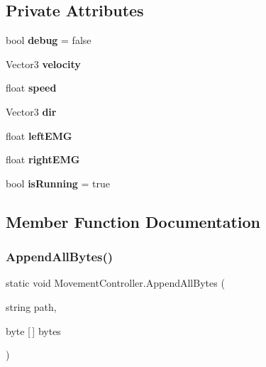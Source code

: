 \subsection*{Private Attributes}
\begin{DoxyCompactItemize}
\item 
\mbox{\label{class_movement_controller_a00c528555c7f5959b3942ded1eb43b33}} 
bool {\bfseries debug} = false
\item 
\mbox{\label{class_movement_controller_aff5f35e406fcb7cff3402f7ff666be3d}} 
Vector3 {\bfseries velocity}
\item 
\mbox{\label{class_movement_controller_afef3c088f09142fe007219818445d82a}} 
float {\bfseries speed}
\item 
\mbox{\label{class_movement_controller_a163d16675c9432f2eef6acd3c35ae3b6}} 
Vector3 {\bfseries dir}
\item 
\mbox{\label{class_movement_controller_a651a2ef11955441e52455216aefc79b3}} 
float {\bfseries left\+E\+MG}
\item 
\mbox{\label{class_movement_controller_a6d33281171e2ffc755f67d3824468ab3}} 
float {\bfseries right\+E\+MG}
\item 
\mbox{\label{class_movement_controller_ade79cdb1a96847f5e2f74047c04b0985}} 
bool {\bfseries is\+Running} = true
\end{DoxyCompactItemize}


\subsection{Member Function Documentation}
\mbox{\label{class_movement_controller_a169d1a4b063c53bce40ab6088fb26acd}} 
\subsubsection{\texorpdfstring{Append\+All\+Bytes()}{AppendAllBytes()}}
{\footnotesize\ttfamily static void Movement\+Controller.\+Append\+All\+Bytes (\begin{DoxyParamCaption}\item[{string}]{path,  }\item[{byte \mbox{[}$\,$\mbox{]}}]{bytes }\end{DoxyParamCaption})\hspace{0.3cm}{\ttfamily [static]}}

